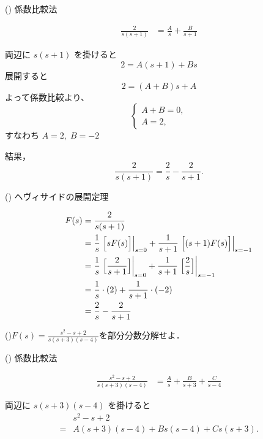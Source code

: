 \documentclass[a4paper,12pt]{report}
\begin{document}
\noindent
\begin{minipage}[t]{0.35\linewidth}
  \quad () 係数比較法
  
  \begin{align*}
    \frac{2}{s(s+1)} &= \frac{A}{s} + \frac{B}{s+1}
  \end{align*}
  
  両辺に \(s(s+1)\) を掛けると
  \[
  2 = A(s+1) + Bs
  \]
  展開すると
  \[
  2 = (A+B)s + A
  \]
  よって係数比較より、
  \[
  \begin{cases}
  A+B = 0,\\[1ex]
  A = 2,
  \end{cases}
  \]
  すなわち \(A=2,\; B=-2\)

  結果，
  \[
  \frac{2}{s(s+1)} = \frac{2}{s} - \frac{2}{s+1}.
  \]
\end{minipage}%
\hfill
\vrule width 1pt
\hfill
\begin{minipage}[t]{0.55\linewidth}
  \quad () ヘヴィサイドの展開定理
  
  \begin{align*}
    F(s) &= \frac{2}{s(s+1)} \\
        &= \frac{1}{s}\left.\Bigl[sF(s)\Bigr]\right|_{s=0} 
            + \frac{1}{s+1}\left.\Bigl[(s+1)F(s)\Bigr]\right|_{s=-1}\\
        &= \frac{1}{s}\left.\Bigl[\frac{2}{s+1}\Bigr]\right|_{s=0} 
            + \frac{1}{s+1}\left.\Bigl[\frac{2}{s}\Bigr]\right|_{s=-1}\\
        &= \frac{1}{s}\cdot(2) 
            + \frac{1}{s+1}\cdot(-2)\\
        &= \frac{2}{s}
            - \frac{2}{s+1}\\
  \end{align*}

\end{minipage}

\newpage

(\MakeUppercase{})\(F(s) =  \frac{s^2-s+2}{s(s+3)(s-4)}\)を部分分数分解せよ．

\vspace{6mm}


  \quad () 係数比較法
  
  \begin{align*}
    \frac{s^2-s+2}{s(s+3)(s-4)} &= \frac{A}{s} + \frac{B}{s+3} + \frac{C}{s-4}
  \end{align*}
  
  両辺に \(s(s+3)(s-4)\) を掛けると
  \begin{align*}
  &s^2 - s + 2 \\
  = &A(s+3)(s-4) + Bs(s-4) + Cs(s+3).
  \end{align*}
  
\end{document}
